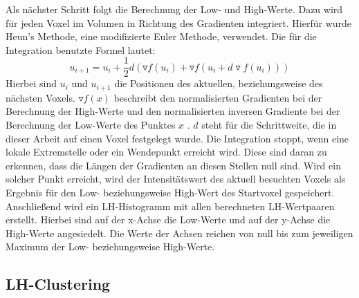 Als nächster Schritt folgt die Berechnung der Low- und High-Werte. Dazu wird für jeden Voxel im Volumen in Richtung des Gradienten integriert.
\newline
Hierfür wurde Heun's Methode, eine modifizierte Euler Methode, verwendet. Die für die Integration benutzte Formel lautet:
\begin{equation}
	u_{i+1} = u_{i} + \frac{1}{2}d(\triangledown f (u_{i}) + \triangledown f(u_{i}+d \triangledown f(u_{i}))) 
\end{equation}
Hierbei sind $u_{i}$ und $u_{i+1}$ die Positionen des aktuellen, beziehungsweise des nächsten Voxels. $\triangledown f(x)$ beschreibt den normalisierten Gradienten bei der Berechnung der High-Werte und den normalisierten inversen Gradiente bei der Berechnung der Low-Werte des Punktes $x$ . $d$ steht für die Schrittweite, die in dieser Arbeit auf einen Voxel festgelegt wurde.
\newline
Die Integration stoppt, wenn eine lokale Extremstelle oder ein Wendepunkt erreicht wird. Diese sind daran zu erkennen, dass die Längen der Gradienten an diesen Stellen null sind.
\newline
Wird ein solcher Punkt erreicht, wird der Intensitätswert des aktuell besuchten Voxels als Ergebnis für den Low- beziehungsweise High-Wert des Startvoxel gespeichert.
\newline
Anschließend wird ein LH-Histogramm mit allen berechneten LH-Wertpaaren erstellt. Hierbei sind auf der x-Achse die Low-Werte und auf der y-Achse die High-Werte angesiedelt. Die Werte der Achsen reichen von null bis zum jeweiligen Maximum der Low- beziehungsweise High-Werte.



\subsection{LH-Clustering}

